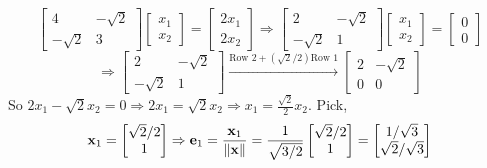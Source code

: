         \[
            \begin{bmatrix}
                4 & -\sqrt{2} \\
                -\sqrt{2} & 3
            \end{bmatrix}
            \begin{bmatrix}
                x_1 \\
                x_2
            \end{bmatrix}
            =
            \begin{bmatrix}
                2x_1 \\
                2x_2
            \end{bmatrix}
            \Rightarrow
            \begin{bmatrix}
                2 & -\sqrt{2} \\
                -\sqrt{2} & 1
            \end{bmatrix}
            \begin{bmatrix}
                x_1 \\
                x_2
            \end{bmatrix}
            =
            \begin{bmatrix}
                0 \\
                0
            \end{bmatrix}
        \]
        \[
            \Rightarrow
            \begin{bmatrix}
                2 & -\sqrt{2} \\
                -\sqrt{2} & 1
            \end{bmatrix}
            \overset{\text{Row 2} + \left(\sqrt{2}/2\right)\text{Row 1}}{\longrightarrow}
            \begin{bmatrix}
                2 & -\sqrt{2} \\
                0 & 0
            \end{bmatrix}
        \]
        So $2x_1 - \sqrt{2}x_2 = 0 \Rightarrow 2x_1 = \sqrt{2}x_2 \Rightarrow x_1 = \frac{\sqrt{2}}{2}x_2$. Pick,
        \[
            \bold{x}_1 
            =
            \begin{bmatrix}
                \sqrt{2}/2 \\
                1
            \end{bmatrix}
            \Rightarrow
            \bold{e}_1
            =
            \frac{\bold{x}_1}{\left\|\bold{x}\right\|}
            =
            \frac{1}{\sqrt{3/2}}
            \begin{bmatrix}
                \sqrt{2}/2 \\
                1
            \end{bmatrix}
            =
            \begin{bmatrix}
                1/\sqrt{3} \\
                \sqrt{2}/\sqrt{3}
            \end{bmatrix}
        \]
        \newline

